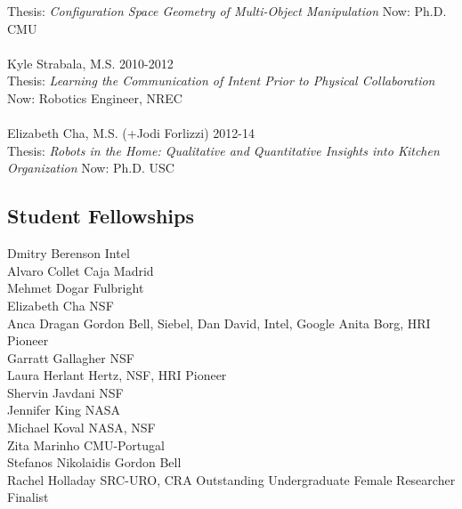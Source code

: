 \documentclass[10pt]{article}
\begin{document}
Thesis: \textit{Configuration Space Geometry of Multi-Object Manipulation} \hfill Now: Ph.D. CMU\\
\\
Kyle Strabala, M.S. \hfill 2010-2012\\
Thesis: \textit{Learning the Communication of Intent Prior to Physical Collaboration} \hfill Now: Robotics Engineer, NREC\\
\\
Elizabeth Cha, M.S. (+Jodi Forlizzi)  \hfill 2012-14\\
Thesis: \textit{Robots in the Home: Qualitative and Quantitative Insights into Kitchen Organization} \hfill Now: Ph.D. USC\\

\subsection{Student Fellowships}
\noindent
Dmitry Berenson \hfill Intel\\
Alvaro Collet \hfill Caja Madrid\\
Mehmet Dogar \hfill Fulbright\\
Elizabeth Cha \hfill NSF\\
Anca Dragan \hfill Gordon Bell, Siebel, Dan David, Intel, Google Anita Borg, HRI Pioneer\\
Garratt Gallagher \hfill NSF\\
Laura Herlant \hfill Hertz, NSF, HRI Pioneer\\
Shervin Javdani \hfill NSF\\
Jennifer King \hfill NASA\\
Michael Koval \hfill NASA, NSF\\
Zita Marinho \hfill CMU-Portugal\\
Stefanos Nikolaidis \hfill Gordon Bell\\
Rachel Holladay \hfill SRC-URO, CRA Outstanding Undergraduate Female Researcher Finalist\\
\end{document}
